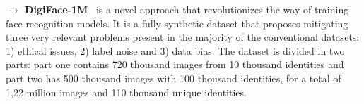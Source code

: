 \documentclass[class=report, crop=false, a4paper, 12pt]{standalone}
\begin{document}
\vspace{0.7\baselineskip}
\noindent\textbf{$\rightarrow$ DigiFace-1M}~\autocite{baeDigiFace1MMillionDigital2023} is a novel approach that revolutionizes the way of training face recognition models. It is a fully synthetic dataset that proposes mitigating three very relevant problems present in the majority of the conventional datasets: 1) ethical issues, 2) label noise and 3) data bias. The dataset is divided in two parts: part one contains 720 thousand images from 10 thousand identities and part two has 500 thousand images with 100 thousand identities, for a total of 1,22 million images and 110 thousand unique identities.

\end{document}
